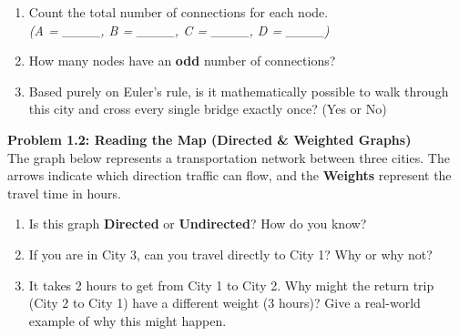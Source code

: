 \documentclass[12pt, a4paper]{article}
\begin{document}
\begin{enumerate}
    \item Count the total number of connections for each node. \\
    \textit{(A = \_\_\_\_, \quad B = \_\_\_\_, \quad C = \_\_\_\_, \quad D = \_\_\_\_)}
    \item How many nodes have an \textbf{odd} number of connections? 
    \item Based purely on Euler's rule, is it mathematically possible to walk through this city and cross every single bridge exactly once? (Yes or No)
\end{enumerate}

\vspace{0.8cm}

\textbf{Problem 1.2: Reading the Map (Directed \& Weighted Graphs)} \\
The graph below represents a transportation network between three cities. The arrows indicate which direction traffic can flow, and the \textbf{Weights} represent the travel time in hours.

\begin{center}
\end{center}

\begin{enumerate}
    \item Is this graph \textbf{Directed} or \textbf{Undirected}? How do you know?
    \item If you are in City 3, can you travel directly to City 1? Why or why not?
    \item It takes 2 hours to get from City 1 to City 2. Why might the return trip (City 2 to City 1) have a different weight (3 hours)? Give a real-world example of why this might happen.
\end{enumerate}
\end{document}

